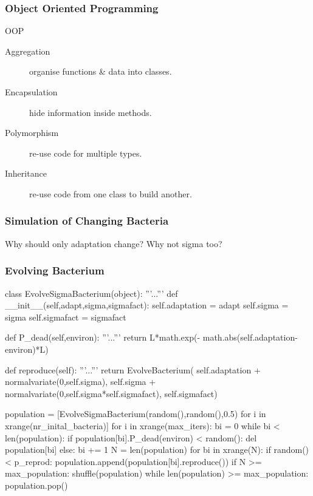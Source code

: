 \begin{frame}[fragile] 
\frametitle{Object Oriented Programming}

\begin{block}{OOP}
\begin{description}
\item[\alert{Aggregation}] organise functions \& data into classes.
\item[\alert{Encapsulation}] hide information inside methods.
\item[Polymorphism] re-use code for multiple types.
\item[Inheritance] re-use code from one class to build another.
\end{description}
\end{block}
\end{frame}

\begin{frame}[fragile]
\frametitle{Simulation of Changing Bacteria}

Why should only adaptation change? Why not \alert{sigma} too?

\end{frame}

\begin{frame}[fragile]
\frametitle{Evolving Bacterium}

\begin{python}
class EvolveSigmaBacterium(object):
    '''...'''
    def __init__(self,adapt,sigma,sigmafact):
        self.adaptation = adapt
        self.sigma = sigma
        self.sigmafact = sigmafact

    def P_dead(self,environ):
        '''...'''
        return L*math.exp(-
                math.abs(self.adaptation-environ)*L)
    
    def reproduce(self):
        '''...'''
        return EvolveBacterium(
            self.adaptation + normalvariate(0,self.sigma),
            self.sigma + normalvariate(0,self.sigma*self.sigmafact),
            self.sigmafact)
\end{python}
\end{frame}

\begin{frame}[fragile]
\begin{python}
population = [EvolveSigmaBacterium(random(),random(),0.5)
        for i in xrange(nr_inital_bacteria)]
for i in xrange(max_iters):
    bi = 0
    while bi < len(population):
        if population[bi].P_dead(environ) < random():
            del population[bi]
        else:
            bi += 1
    N = len(population)
    for bi in xrange(N):
        if random() < p_reprod:
            population.append(population[bi].reproduce())
    if N >= max_population:
        shuffle(population)
        while len(population) >= max_population:
            population.pop()
\end{python}
\end{frame}

